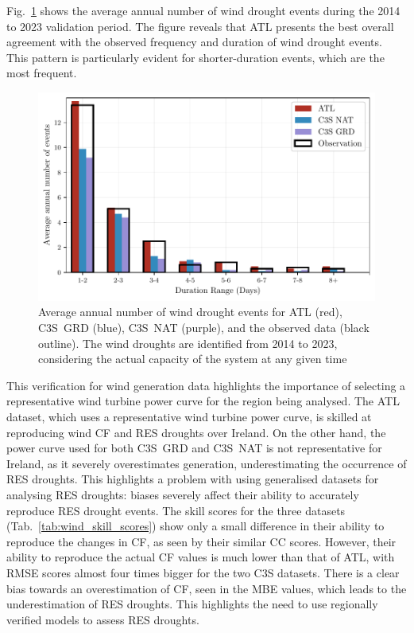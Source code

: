 \documentclass[preprint, 12pt]{elsarticle}
\begin{document}
Fig.~\ref{fig:bar_number_events_verification_wind} shows the average annual number of wind drought events during the 2014 to 2023 validation period. The figure reveals that ATL presents the best overall agreement with the observed frequency and duration of wind drought events. This pattern is particularly evident for shorter-duration events, which are the most frequent.

\begin{figure}[!ht]
	\centering
	\includegraphics[width=\textwidth]{verification_wind_number_events.pdf}
	\caption{Average annual number of wind drought events for ATL (red), C3S~GRD (blue), C3S~NAT (purple), and the observed data (black outline). The wind droughts are identified from 2014 to 2023, considering the actual capacity of the system at any given time}
	\label{fig:bar_number_events_verification_wind}
\end{figure}

This verification for wind generation data highlights the importance of selecting a representative wind turbine power curve for the region being analysed. The ATL dataset, which uses a representative wind turbine power curve, is skilled at reproducing wind CF and RES droughts over Ireland. On the other hand, the power curve used for both C3S~GRD and C3S~NAT is not representative for Ireland, as it severely overestimates generation, underestimating the occurrence of RES droughts. This highlights a problem with using generalised datasets for analysing RES droughts: biases severely affect their ability to accurately reproduce RES drought events. The skill scores for the three datasets (Tab.~\ref{tab:wind_skill_scores}) show only a small difference in their ability to reproduce the changes in CF, as seen by their similar CC scores. However, their ability to reproduce the actual CF values is much lower than that of ATL, with RMSE scores almost four times bigger for the two C3S datasets. There is a clear bias towards an overestimation of CF, seen in the MBE values, which leads to the underestimation of RES droughts. This highlights the need to use regionally verified models to assess RES droughts.
\end{document}
